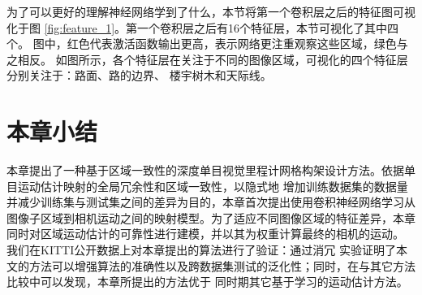 为了可以更好的理解神经网络学到了什么，本节将第一个卷积层之后的特征图可视化于图
\ref{fig:feature_1}。第一个卷积层之后有16个特征层，本节可视化了其中四个。 图中，红色代表激活函数输出更高，表示网络更注重观察这些区域，绿色与之相反。
如图所示，各个特征层在关注于不同的图像区域，可视化的四个特征层分别关注于：路面、路的边界、
楼宇树木和天际线。

\section{本章小结}
\label{sec:conclusion}
本章提出了一种基于区域一致性的深度单目视觉里程计网格构架设计方法。依据单目运动估计映射的全局冗余性和区域一致性，以隐式地
增加训练数据集的数据量并减少训练集与测试集之间的差异为目的，本章首次提出使用卷积神经网络学习从图像子区域到相机运动之间的映射模型。为了适应不同图像区域的特征差异，本章同时对区域运动估计的可靠性进行建模，并以其为权重计算最终的相机的运动。
我们在KITTI公开数据上对本章提出的算法进行了验证：通过消冗
实验证明了本文的方法可以增强算法的准确性以及跨数据集测试的泛化性；同时，在与其它方法比较中可以发现，本章所提出的方法优于
同时期其它基于学习的运动估计方法。